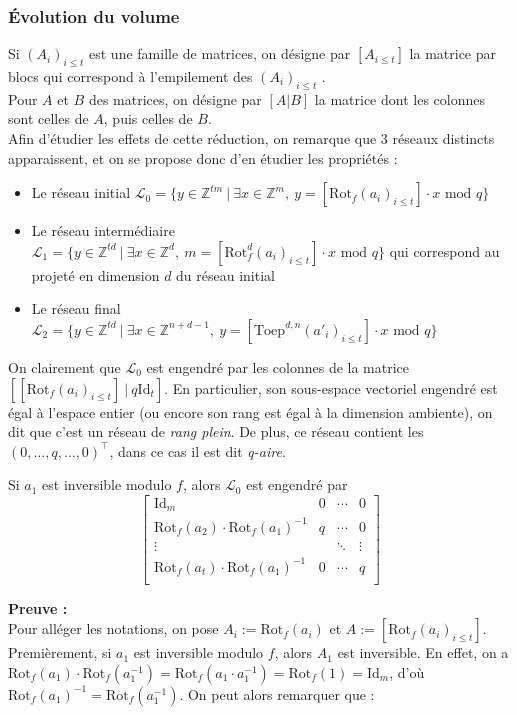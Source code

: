 \documentclass[11pt,a4paper]{article}
\begin{document}
\subsubsection{Évolution du volume }
Si $(A_i)_{i \leq t}$ est une famille de matrices, on désigne par $[A_{i\leq t}]$ la matrice par blocs qui correspond à l'empilement des  $(A_i)_{i \leq t}$ . \\
Pour $A$ et $B$ des matrices, on désigne par $[A|B]$ la matrice dont les colonnes sont celles de $A$, puis celles de $B$. \\

Afin d'étudier les effets de cette réduction, on remarque que $3$ réseaux distincts apparaissent, et on se propose donc d'en étudier les propriétés : 
\begin{itemize}
\item Le réseau initial $\mathcal{L}_0 = \{ y \in \mathbb{Z}^{tm} \ | \ \exists x\in \mathbb{Z}^m,\ y=[\text{Rot}_f(a_i)_{i\leq t}]\cdot x \text{ mod }q \}$
\item Le réseau intermédiaire $\mathcal{L}_1 =\{ y \in \mathbb{Z}^{td} \ | \ \exists x\in \mathbb{Z}^d,\ m=[\text{Rot}_f^d(a_i)_{i\leq t}]\cdot x \text{ mod }q \}$  qui correspond au projeté en dimension $d$ du réseau initial
\item Le réseau final $\mathcal{L}_2 = \{ y \in \mathbb{Z}^{td} \ | \ \exists x\in \mathbb{Z}^{n+d-1},\ y=[\text{Toep}^{d,n}(a'_i)_{i\leq t}]\cdot x \text{ mod }q\}$ \\
\end{itemize}

On clairement que $\mathcal{L}_0$ est engendré par les colonnes de la matrice $[[\text{Rot}_f(a_i)_{i\leq t}] \ |\ q\text{Id}_t]$. En particulier, son sous-espace vectoriel engendré est égal à l'espace entier (ou encore son rang est égal à la dimension ambiente), on dit que c'est un réseau de \textit{rang plein}. De plus, ce réseau contient les $(0,\dots,q,\dots,0)^\top$, dans ce cas il est dit \textit{q-aire}.\\

\begin{lemma}
Si $a_1$ est inversible modulo $f$, alors $\mathcal{L}_0$ est engendré par 
$$ \left[\begin{array}{c|ccc}
\text{Id}_m & 0 &\cdots &0\\
\text{Rot}_f(a_2)\cdot\text{Rot}_f(a_1)^{-1}&q&\cdots & 0\\
\vdots & &\ddots & \vdots\\
\text{Rot}_f(a_t)\cdot\text{Rot}_f(a_1)^{-1}& 0 & \cdots &q\\
\end{array}\right] $$
\end{lemma}
\textbf{Preuve :} \\
Pour alléger les notations, on pose $A_i := \text{Rot}_f(a_i)$ et $A:=[\text{Rot}_f(a_i)_{i\leq t}]$. Premièrement, si $a_1$ est inversible modulo $f$, alors $A_1$ est inversible. En effet, on a $\text{Rot}_f(a_1)\cdot\text{Rot}_f(a_1^{-1})=\text{Rot}_f(a_1\cdot a_1^{-1})=\text{Rot}_f(1)=\text{Id}_m$, d'où $\text{Rot}_f(a_1)^{-1}=\text{Rot}_f(a_1^{-1})$. On peut alors remarquer que : \\
\end{document}
